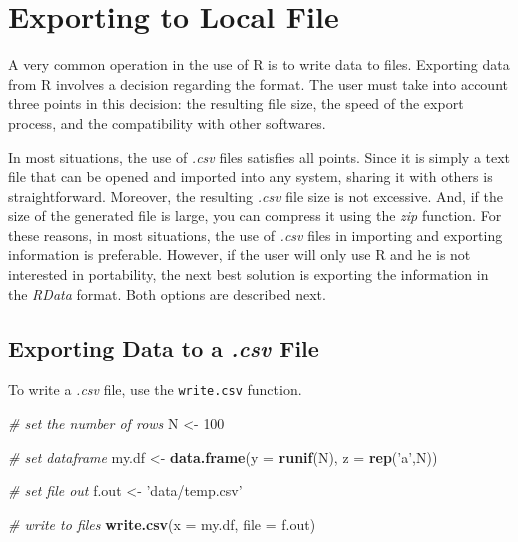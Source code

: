 \documentclass[11pt,]{book}
\newenvironment{Shaded}{\begin{snugshade}}{\end{snugshade}}
\newcommand{\KeywordTok}[1]{\textcolor[rgb]{0.27,0.27,0.27}{\textbf{#1}}}
\newcommand{\DataTypeTok}[1]{\textcolor[rgb]{0.27,0.27,0.27}{#1}}
\newcommand{\DecValTok}[1]{\textcolor[rgb]{0.06,0.06,0.06}{#1}}
\newcommand{\StringTok}[1]{\textcolor[rgb]{0.5,0.5,0.5}{#1}}
\newcommand{\CommentTok}[1]{\textcolor[rgb]{0.56,0.35,0.01}{\textit{#1}}}
\newcommand{\NormalTok}[1]{#1}
\begin{document}
\section{Exporting to Local File}\label{exporting-to-local-file}

A very common operation in the use of R is to write data to files.
Exporting data from R involves a decision regarding the format. The user
must take into account three points in this decision: the resulting file
size, the speed of the export process, and the compatibility with other
softwares.

In most situations, the use of \emph{.csv} files satisfies all points.
Since it is simply a text file that can be opened and imported into any
system, sharing it with others is straightforward. Moreover, the
resulting \emph{.csv} file size is not excessive. And, if the size of
the generated file is large, you can compress it using the \emph{zip}
function. For these reasons, in most situations, the use of \emph{.csv}
files in importing and exporting information is preferable. However, if
the user will only use R and he is not interested in portability, the
next best solution is exporting the information in the \emph{RData}
format. Both options are described next.

\subsection{\texorpdfstring{Exporting Data to a \emph{.csv}
File}{Exporting Data to a .csv File}}\label{exporting-data-to-a-.csv-file}

To write a \emph{.csv} file, use the \texttt{write.csv} function.
 

\begin{Shaded}
\begin{Highlighting}[]
\CommentTok{# set the number of rows}
\NormalTok{N <-}\StringTok{ }\DecValTok{100}

\CommentTok{# set dataframe}
\NormalTok{my.df <-}\StringTok{ }\KeywordTok{data.frame}\NormalTok{(}\DataTypeTok{y =} \KeywordTok{runif}\NormalTok{(N), }\DataTypeTok{z =} \KeywordTok{rep}\NormalTok{(}\StringTok{'a'}\NormalTok{,N))}

\CommentTok{# set file out}
\NormalTok{f.out <-}\StringTok{ 'data/temp.csv'}

\CommentTok{# write to files}
\KeywordTok{write.csv}\NormalTok{(}\DataTypeTok{x =}\NormalTok{ my.df, }\DataTypeTok{file =}\NormalTok{ f.out)}
\end{Highlighting}
\end{Shaded}
\end{document}
